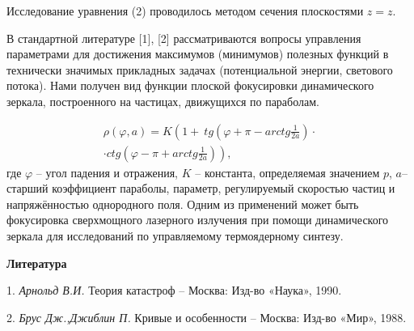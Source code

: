 Исследование уравнения (2) проводилось методом сечения плоскостями $z=z$.

В стандартной литературе [1], [2] рассматриваются вопросы управления параметрами для достижения максимумов (минимумов) полезных функций в технически значимых прикладных задачах (потенциальной энергии, светового потока). Нами получен вид функции плоской фокусировки динамического зеркала, построенного на частицах, движущихся по параболам.

\begin{multline*}
	\rho (\varphi ,a)=
	K\left(1+\ tg\left(\varphi +\pi -arctg\frac{1}{2a}\right)\cdot
	\right.\\ \cdot \left.
	 ctg\left(\varphi -\pi +arctg\frac{1}{2a}\right)\right),
\end{multline*}
где  $\varphi $ -- угол падения и отражения, $K$ -- константа, определяемая значением $p$, $a$-- старший коэффициент параболы, параметр, регулируемый скоростью частиц и напряжённостью  однородного поля. Одним из применений может быть фокусировка сверхмощного лазерного излучения при помощи динамического зеркала для исследований по управляемому термоядерному синтезу.



\smallskip \centerline{\bf Литература}\nopagebreak

1. {\it Арнольд В.И.} Теория катастроф -- Москва: Изд-во «Наука», 1990.

2. {\it Брус Дж.,Джиблин П.} Кривые и особенности -- Москва: Изд-во «Мир», 1988.


